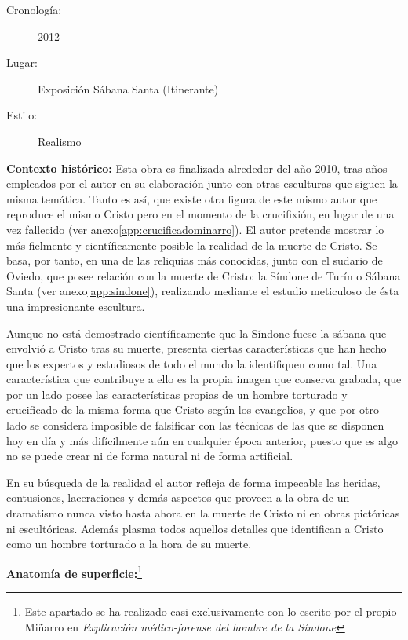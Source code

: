 \newpage

\begin{description}
\item[Cronología:] 2012
\item[Lugar:] Exposición Sábana Santa (Itinerante)
\item[Estilo:] Realismo
\end{description}

\textbf{Contexto histórico:} Esta obra es finalizada alrededor del año 2010, tras años empleados por el autor en su elaboración junto con otras esculturas que siguen la misma temática. Tanto es así, que existe otra figura de este mismo autor que reproduce el mismo Cristo pero en el momento de la crucifixión, en lugar de una vez fallecido (ver anexo\autoref{app:crucificadominarro}). El autor pretende mostrar lo más fielmente y científicamente posible la realidad de la muerte de Cristo. Se basa, por tanto, en una de las reliquias más conocidas, junto con el sudario de Oviedo, que posee relación con la muerte de Cristo: la Síndone de Turín o Sábana Santa (ver anexo\autoref{app:sindone}), realizando mediante el estudio meticuloso de ésta una impresionante escultura.

Aunque no está demostrado científicamente que la Síndone fuese la sábana que envolvió a Cristo tras su muerte, presenta ciertas características que han hecho que los expertos y estudiosos de todo el mundo la identifiquen como tal. Una característica que contribuye a ello es la propia imagen que conserva grabada, que por un lado posee las características propias de un hombre torturado y crucificado de la misma forma que Cristo según los evangelios, y que por otro lado se considera imposible de falsificar con las técnicas de las que se disponen hoy en día y más difícilmente aún en cualquier época anterior, puesto que es algo no se puede crear ni de forma natural ni de forma artificial.

En su búsqueda de la realidad el autor refleja de forma impecable las heridas, contusiones, laceraciones y demás aspectos que proveen a la obra de un dramatismo nunca visto hasta ahora en la muerte de Cristo ni en obras pictóricas ni escultóricas. Además plasma todos aquellos detalles que identifican a Cristo como un hombre torturado a la hora de su muerte.

\vspace{12pt}
\textbf{Anatomía de superficie:}\footnote{Este apartado se ha realizado casi exclusivamente con lo escrito por el propio Miñarro en \textit{Explicación médico-forense del hombre de la Síndone}\cite{RefWorks:61}}

